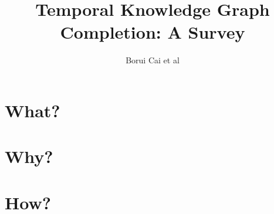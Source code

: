 \documentclass[12pt]{article}
\begin{document}
\title{Temporal Knowledge Graph Completion: A Survey}
\author{Borui Cai et al}
\maketitle

\section{What?}

\section{Why?}

\section{How?}

\end{document}
